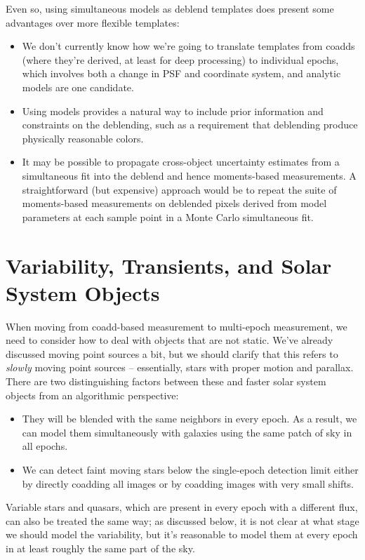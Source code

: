 \documentclass[10pt]{article}
\begin{document}
Even so, using simultaneous models as deblend templates does present some
advantages over more flexible templates:
\begin{itemize}
\item We don't currently know how we're going to translate templates from
coadds (where they're derived, at least for deep processing) to individual
epochs, which involves both a change in PSF and coordinate system, and
analytic models are one candidate.
\item Using models provides a natural way to include prior information and
constraints on the deblending, such as a requirement that deblending produce
physically reasonable colors.
\item It may be possible to propagate cross-object uncertainty estimates
from a simultaneous fit into the deblend and hence moments-based
measurements.  A straightforward (but expensive) approach would be to repeat
the suite of moments-based measurements on deblended pixels derived from model
parameters at each sample point in a Monte Carlo simultaneous fit.
\end{itemize}

\section{Variability, Transients, and Solar System Objects}

\label{sec:time-domain}

When moving from coadd-based measurement to multi-epoch measurement, we need
to consider how to deal with objects that are not static.  We've already
discussed moving point sources a bit, but we should clarify that this refers
to {\em slowly} moving point sources -- essentially, stars with proper motion
and parallax.  There are two distinguishing factors between these and faster
solar system objects from an algorithmic perspective:
\begin{itemize}
\item They will be blended with the same neighbors in every epoch.  As a
    result, we can model them simultaneously with galaxies using the same
    patch of sky in all epochs.
\item We can detect faint moving stars below the single-epoch detection limit
    either by directly coadding all images or by coadding images with
    very small shifts.
\end{itemize}
Variable stars and quasars, which are present in every epoch with a different
flux, can also be treated the same way; as discussed below, it is not clear at
what stage we should model the variability, but it's reasonable to model them
at every epoch in at least roughly the same part of the sky.
\end{document}

